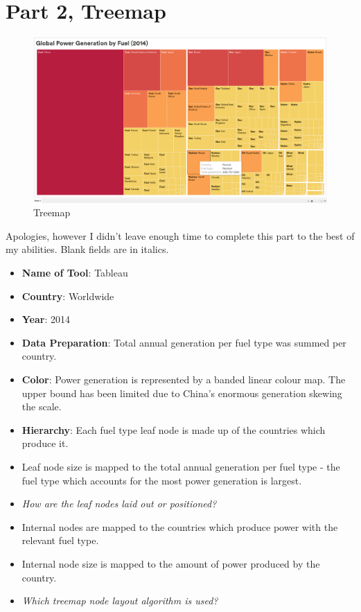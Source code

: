 \hypertarget{part-2-treemap-1}{%
\section{Part 2, Treemap}\label{part-2-treemap-1}}

\begin{figure}[ht]
  \centering
  \includegraphics[width=\textwidth]{../img/treemap}
  \caption{Treemap}
\end{figure}

Apologies, however I didn't leave enough time to complete this part to the best of my abilities. Blank fields are in italics.

\begin{itemize}
\tightlist
\item
  \textbf{Name of Tool}: Tableau
\item
  \textbf{Country}: Worldwide
\item
  \textbf{Year}: 2014
\item
  \textbf{Data Preparation}: Total annual generation per fuel type was summed per country.
\item
  \textbf{Color}: Power generation is represented by a banded linear colour map. The upper bound has been limited due to China's enormous generation skewing the scale.
\item
  \textbf{Hierarchy}: Each fuel type leaf node is made up of the countries which produce it.
\item
  Leaf node size is mapped to the total annual generation per fuel type - the fuel type which accounts for the most power generation is largest.
\item
  \textit{How are the leaf nodes laid out or positioned?}  
\item
  Internal nodes are mapped to the countries which produce power with the relevant fuel type. 
\item
  Internal node size is mapped to the amount of power produced by the country.
\item
  \textit{Which treemap node layout algorithm is used?}
\end{itemize}